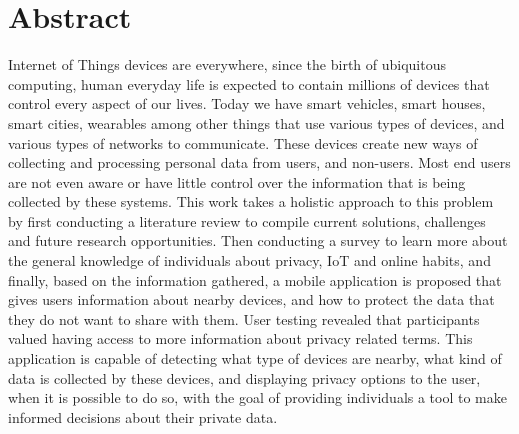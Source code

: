 %
%
\chapter*{Abstract}
\justify

Internet of Things devices are everywhere, since the birth of ubiquitous
computing, human everyday life is expected to contain millions of
devices that control every aspect of our lives. Today we have smart vehicles,
smart houses, smart cities, wearables among other things that use various
types of devices, and various types of networks to communicate. These devices
create new ways of collecting and processing personal data from users, and
non-users. Most end users are not even aware or have little control over
the information that is being collected by these systems. This work takes
a holistic approach to this problem by first conducting a literature review
to compile current solutions, challenges and future research opportunities.
Then conducting a survey to learn more about the general knowledge of
individuals about privacy, IoT and online habits, and finally, based on the
information gathered, a mobile application is proposed that gives users
information about nearby devices, and how
to protect the data that they do not want to share with them.
User testing revealed that participants valued having access to more
information about privacy related terms. This
application is capable of detecting what type of devices are nearby, what kind
of data is collected by these devices, and displaying privacy options to the user,
when it is possible to do so, with the goal of providing individuals a tool to make
informed decisions about their private data.

